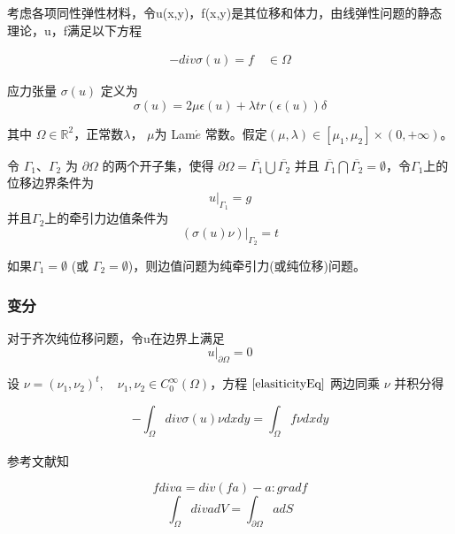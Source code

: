 \documentclass[a4paper,UTF8,titlepage]{ctexart}
\begin{document}
考虑各项同性弹性材料，令u(x,y)，f(x,y)是其位移和体力，由线弹性问题的静态理论，u，f满足以下方程

\begin{equation}
\begin{aligned}
	-div \sigma(u) = f \quad  \in \Omega 
\end{aligned}
\label{elasiticityEq}
\end{equation}

应力张量 $\sigma(u)$ 定义为
\begin{equation}
\sigma(u) = 2 \mu \epsilon(u) + \lambda tr(\epsilon(u)) \delta
\end{equation}

其中 $\Omega \in \mathbb{R}^2$，正常数$\lambda$， $\mu$为 Lam$\acute{e}$ 常数。假定$(\mu, \lambda) \in [\mu_1,\mu_2] \times (0, +\infty)$。

令 $\Gamma_1$、$\Gamma_2$ 为 $\partial \Omega$ 的两个开子集，使得 $\partial \Omega = \overline{\Gamma_1} \bigcup \overline{\Gamma_2}$ 并且 $\overline{\Gamma_1} \bigcap \overline{\Gamma_2} = \emptyset$，令$\Gamma_1$上的位移边界条件为
\begin{equation}
	u|_{\Gamma_1} = g
\end{equation}
并且$\Gamma_2$上的牵引力边值条件为
\begin{equation}
	(\sigma(u) \nu) |_{\Gamma_2} = t
\end{equation}

如果$\Gamma_1 = \emptyset$ (或 $\Gamma_2 = \emptyset$)，则边值问题为纯牵引力(或纯位移)问题。

\subsubsection{变分}

对于齐次纯位移问题，令u在边界上满足
\begin{equation}
u |_{\partial \Omega} = 0
\label{qcbjtj}
\end{equation}

设 $\nu = (\nu_1,\nu_2)^t, \quad \nu_1, \nu_2 \in C_0^{\infty}(\Omega)$，方程 $\eqref{elasiticityEq}$ 两边同乘 $\nu$ 并积分得

\begin{equation}
-\int_{\Omega} div \sigma(u) \nu dxdy = \int_{\Omega} f \nu dxdy
\label{dycjf}
\end{equation}

参考文献知\textsuperscript{\cite{陈纪修2004数学分析}}

\begin{equation}
	f div a = div(fa) - a : grad f 
\label{fbjf}
\end{equation}
\begin{equation}
	\int_{\Omega} div a dV = \int_{\partial \Omega} a dS
\label{sddl}
\end{equation}
\end{document}
